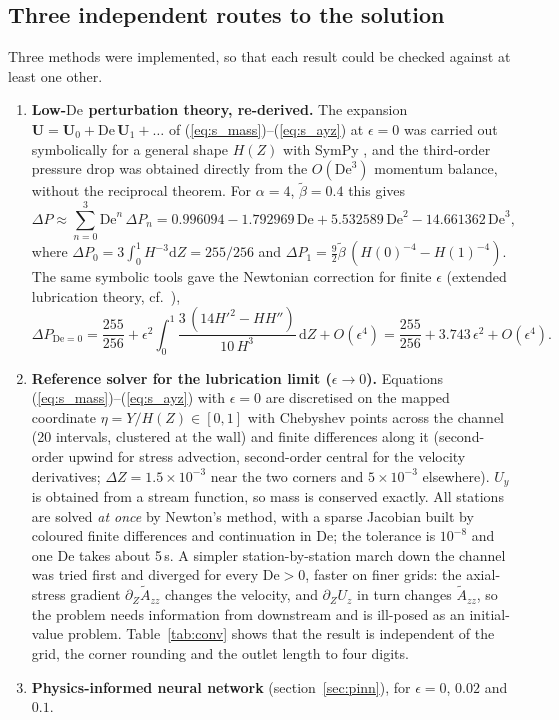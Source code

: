 \documentclass[11pt,a4paper]{article}
\newcommand{\De}{\mathrm{De}}
\newcommand{\bt}{\tilde\beta}
\begin{document}
\subsection{Three independent routes to the solution}
Three methods were implemented, so that each result could be checked against at least one other.
\begin{enumerate}[label=(\alph*)]
\item \textbf{Low-$\De$ perturbation theory, re-derived.} The expansion $\mathbf U=\mathbf U_0+\De\,\mathbf U_1+\dots$ of (\ref{eq:s_mass})--(\ref{eq:s_ayz}) at $\epsilon=0$ was carried out symbolically for a general shape $H(Z)$ with SymPy \cite{meurer2017}, and the third-order pressure drop was obtained directly from the $O(\De^3)$ momentum balance, without the reciprocal theorem. For $\alpha=4$, $\bt=0.4$ this gives
\begin{equation}
\Delta P\approx \sum_{n=0}^{3}\De^n\,\Delta P_n
=0.996094-1.792969\,\De+5.532589\,\De^2-14.661362\,\De^3,
\label{eq:series}
\end{equation}
where $\Delta P_0=3\int_0^1H^{-3}\mathrm dZ=255/256$ and $\Delta P_1=\tfrac92\bt\,(H(0)^{-4}-H(1)^{-4})$. The same symbolic tools gave the Newtonian correction for finite $\epsilon$ (extended lubrication theory, cf.\ \cite{tavakol2017}),
\begin{equation}
\Delta P_{\De=0}=\frac{255}{256}+\epsilon^2\!\int_0^1\!\frac{3\,(14H'^2-HH'')}{10\,H^3}\,\mathrm dZ+O(\epsilon^4)=\frac{255}{256}+3.743\,\epsilon^2+O(\epsilon^4).
\label{eq:eps2}
\end{equation}

\item \textbf{Reference solver for the lubrication limit ($\epsilon\to0$).} Equations (\ref{eq:s_mass})--(\ref{eq:s_ayz}) with $\epsilon=0$ are discretised on the mapped coordinate $\eta=Y/H(Z)\in[0,1]$ with Chebyshev points across the channel \cite{trefethen2000} (20 intervals, clustered at the wall) and finite differences along it (second-order upwind for stress advection, second-order central for the velocity derivatives; $\Delta Z=1.5\times10^{-3}$ near the two corners and $5\times10^{-3}$ elsewhere). $U_y$ is obtained from a stream function, so mass is conserved exactly. All stations are solved \emph{at once} by Newton's method, with a sparse Jacobian built by coloured finite differences \cite{curtis1974} and continuation in $\De$; the tolerance is $10^{-8}$ and one $\De$ takes about 5\,s. A simpler station-by-station march down the channel was tried first and diverged for every $\De>0$, faster on finer grids: the axial-stress gradient $\partial_Z\tilde A_{zz}$ changes the velocity, and $\partial_ZU_z$ in turn changes $\tilde A_{zz}$, so the problem needs information from downstream and is ill-posed as an initial-value problem. Table~\ref{tab:conv} shows that the result is independent of the grid, the corner rounding and the outlet length to four digits.

\item \textbf{Physics-informed neural network} (section~\ref{sec:pinn}), for $\epsilon=0$, $0.02$ and $0.1$.
\end{enumerate}
\end{document}
